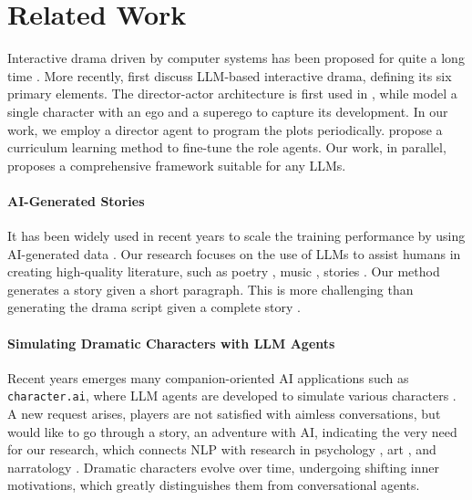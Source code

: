 \section{Related Work}
Interactive drama driven by computer systems has been proposed for quite a long time \citep{DBLP:journals/sigart/BatesLR91,DBLP:books/daglib/0081917}.
More recently, \citet{DBLP:conf/acl/WuWJL0024} first discuss LLM-based interactive drama, defining its six primary elements. The director-actor architecture is first used in \citet{DBLP:conf/acl/HanCLXY24}, while \citet{DBLP:journals/corr/abs-2408-01725} model a single character with an ego and a superego to capture its development. In our work, we employ a director agent to program the plots periodically. \citet{DBLP:conf/acl/WuWJL0024} propose a curriculum learning method to fine-tune the role agents. Our work, in parallel, proposes a comprehensive framework suitable for any LLMs.

\paragraph{AI-Generated Stories}
It has been widely used in recent years to scale the training performance by using AI-generated data \citep{DBLP:conf/acl/WangKMLSKH23,DBLP:conf/emnlp/LeePSWJ23,DBLP:conf/acl/WuWJL0024}.
Our research focuses on the use of LLMs to assist humans in creating high-quality literature, such as poetry \citep{DBLP:conf/emnlp/OrmazabalAASA22,DBLP:conf/emnlp/ChakrabartyP022}, music \citep{DBLP:journals/corr/abs-2210-13944,DBLP:journals/corr/abs-2308-12982}, stories \citep{DBLP:conf/naacl/TanYAXH21,DBLP:conf/emnlp/TianHLJSCMP24}. Our method generates a story given a short paragraph. This is more challenging than generating the drama script given a complete story \citep{DBLP:conf/aaai/ZhaoZ0ZL0024}.

\paragraph{Simulating Dramatic Characters with LLM Agents}
Recent years emerges many companion-oriented AI applications such as \texttt{character.ai}, where LLM agents are developed to simulate various characters \citep{DBLP:journals/nature/ShanahanMR23,DBLP:conf/emnlp/ShaoLDQ23,DBLP:journals/corr/abs-2407-11484,DBLP:conf/acl/Lu0ZZ24}. A new request arises, players are not satisfied with aimless conversations, but would like to go through a story, an adventure with AI, indicating the very need for our research, which connects NLP with research in psychology \citep{DBLP:journals/corr/abs-2408-01725}, art \citep{DBLP:conf/chi/MirowskiMPE23}, and narratology \citep{todorov1969grammaire}.
Dramatic characters evolve over time, undergoing shifting inner motivations, which greatly distinguishes them from conversational agents.